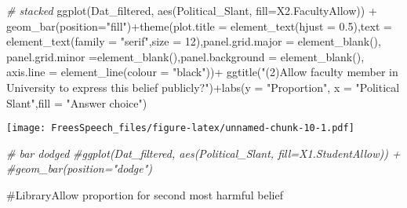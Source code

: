 \documentclass[
]{article}
\newenvironment{Shaded}{\begin{snugshade}}{\end{snugshade}}
\newcommand{\AttributeTok}[1]{\textcolor[rgb]{0.77,0.63,0.00}{#1}}
\newcommand{\CommentTok}[1]{\textcolor[rgb]{0.56,0.35,0.01}{\textit{#1}}}
\newcommand{\DecValTok}[1]{\textcolor[rgb]{0.00,0.00,0.81}{#1}}
\newcommand{\FloatTok}[1]{\textcolor[rgb]{0.00,0.00,0.81}{#1}}
\newcommand{\FunctionTok}[1]{\textcolor[rgb]{0.00,0.00,0.00}{#1}}
\newcommand{\NormalTok}[1]{#1}
\newcommand{\SpecialCharTok}[1]{\textcolor[rgb]{0.00,0.00,0.00}{#1}}
\newcommand{\StringTok}[1]{\textcolor[rgb]{0.31,0.60,0.02}{#1}}
\begin{document}
\begin{Shaded}
\begin{Highlighting}[]
\CommentTok{\# stacked}
\FunctionTok{ggplot}\NormalTok{(Dat\_filtered, }\FunctionTok{aes}\NormalTok{(Political\_Slant, }\AttributeTok{fill=}\NormalTok{X2.FacultyAllow)) }\SpecialCharTok{+} 
  \FunctionTok{geom\_bar}\NormalTok{(}\AttributeTok{position=}\StringTok{"fill"}\NormalTok{)}\SpecialCharTok{+}\FunctionTok{theme}\NormalTok{(}\AttributeTok{plot.title =} \FunctionTok{element\_text}\NormalTok{(}\AttributeTok{hjust =} \FloatTok{0.5}\NormalTok{),}\AttributeTok{text =} \FunctionTok{element\_text}\NormalTok{(}\AttributeTok{family =} \StringTok{"serif"}\NormalTok{,}\AttributeTok{size =} \DecValTok{12}\NormalTok{),}\AttributeTok{panel.grid.major =} \FunctionTok{element\_blank}\NormalTok{(), }\AttributeTok{panel.grid.minor =}\FunctionTok{element\_blank}\NormalTok{(),}\AttributeTok{panel.background =} \FunctionTok{element\_blank}\NormalTok{(), }\AttributeTok{axis.line =} \FunctionTok{element\_line}\NormalTok{(}\AttributeTok{colour =} \StringTok{"black"}\NormalTok{))}\SpecialCharTok{+}
\FunctionTok{ggtitle}\NormalTok{(}\StringTok{"(2)Allow faculty member in University to express this belief publicly?"}\NormalTok{)}\SpecialCharTok{+}\FunctionTok{labs}\NormalTok{(}\AttributeTok{y =} \StringTok{"Proportion"}\NormalTok{, }\AttributeTok{x =} \StringTok{"Political Slant"}\NormalTok{,}\AttributeTok{fill =} \StringTok{"Answer choice"}\NormalTok{)}
\end{Highlighting}
\end{Shaded}

\texttt{[image: FreesSpeech\_files/figure-latex/unnamed-chunk-10-1.pdf]}

\begin{Shaded}
\begin{Highlighting}[]
\CommentTok{\# bar dodged}
\CommentTok{\#ggplot(Dat\_filtered, aes(Political\_Slant, fill=X1.StudentAllow)) + }
  \CommentTok{\#geom\_bar(position="dodge")}
\end{Highlighting}
\end{Shaded}

\#LibraryAllow proportion for second most harmful belief
\end{document}

